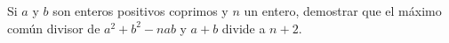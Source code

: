 Si $a$ y $b$ son enteros positivos coprimos y $n$ un entero, demostrar que el máximo común divisor de $a^2+b^2-nab$ y $a+b$ divide a $n+2$.
